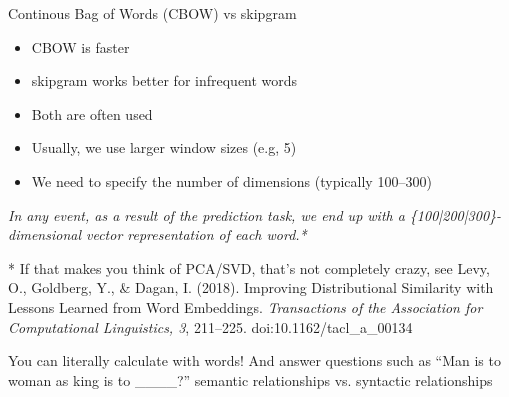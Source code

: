 \documentclass[compress]{beamer}
\begin{document}
\begin{frame}{Continous Bag of Words (CBOW) vs skipgram}
	\begin{itemize}
		\item CBOW is faster
		\item skipgram works better for infrequent words
		\item Both are often used
		\item Usually, we use larger window sizes (e.g, 5)
		\item We need to specify the number of dimensions (typically 100--300)
	\end{itemize}
	\pause
	
	\textit{In any event, as a result of the prediction task, we end up with a \{100|200|300\}-dimensional vector representation of each word.*}
	
	
	\tiny{* If that makes you think of PCA/SVD, that's not completely crazy, see Levy, O., Goldberg, Y., \& Dagan, I. (2018). Improving Distributional Similarity with Lessons Learned from Word Embeddings. \textit{Transactions of the Association for Computational Linguistics, 3}, 211--225. doi:10.1162/tacl\_a\_00134}\\
\end{frame}




\begin{frame}{You can literally calculate with words!}
	And answer questions such as ``Man is to woman as king is to \_\_\_\_?''
	semantic relationships vs. syntactic relationships
\end{frame}
\end{document}
